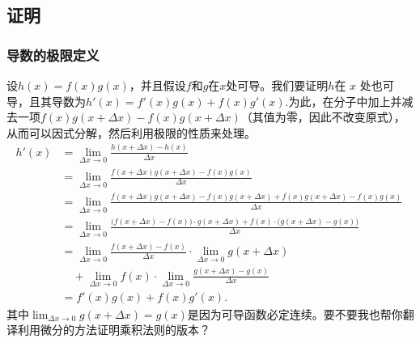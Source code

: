 \subsection{证明}
\subsubsection{导数的极限定义}
设$h(x) = f(x)g(x)$，并且假设$f$和$g$在$x$处可导。我们要证明$h$在 $x$ 处也可导，且其导数为$h'(x) = f'(x)g(x) + f(x)g'(x)$.为此，在分子中加上并减去一项$f(x)g(x+\Delta x) - f(x)g(x+\Delta x)$（其值为零，因此不改变原式），从而可以因式分解，然后利用极限的性质来处理。
$$
\begin{aligned}
h'(x) &= \lim_{\Delta x \to 0} \frac{h(x+\Delta x) - h(x)}{\Delta x} \\[6pt]
&= \lim_{\Delta x \to 0} \frac{f(x+\Delta x)g(x+\Delta x) - f(x)g(x)}{\Delta x} \\[6pt]
&= \lim_{\Delta x \to 0} \frac{f(x+\Delta x)g(x+\Delta x) - f(x)g(x+\Delta x) + f(x)g(x+\Delta x) - f(x)g(x)}{\Delta x} \\[6pt]
&= \lim_{\Delta x \to 0} \frac{\big(f(x+\Delta x)-f(x)\big)\cdot g(x+\Delta x) + f(x)\cdot \big(g(x+\Delta x)-g(x)\big)}{\Delta x} \\[6pt]
&= \lim_{\Delta x \to 0} \frac{f(x+\Delta x)-f(x)}{\Delta x} \cdot \lim_{\Delta x \to 0} g(x+\Delta x) \\ 
&\quad + \lim_{\Delta x \to 0} f(x) \cdot \lim_{\Delta x \to 0} \frac{g(x+\Delta x)-g(x)}{\Delta x} \\[6pt]
&= f'(x)g(x) + f(x)g'(x).
\end{aligned}~
$$
其中$\lim_{\Delta x \to 0} g(x+\Delta x) = g(x)$是因为可导函数必定连续。要不要我也帮你翻译利用微分的方法证明乘积法则的版本？
